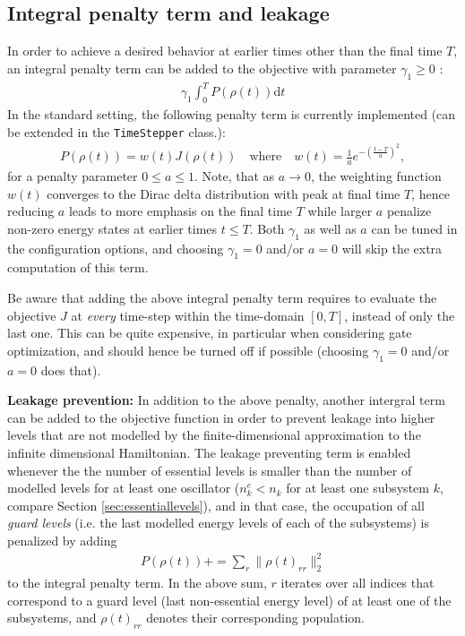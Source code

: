\documentclass[11pt]{article}
\begin{document}
\subsection{Integral penalty term and leakage}\label{sec:penalty}
In order to achieve a desired behavior at earlier times other than the final time $T$, an integral penalty term can be added to the objective with parameter $\gamma_1 \geq 0$ :
\begin{align}\label{eq:penaltyterm}
 \gamma_1 \int_0^T P(\rho(t)) \mathrm{d}t
\end{align}
In the standard setting, the following penalty term is currently implemented (can be extended in the \texttt{TimeStepper} class.):
\begin{align}\label{eq:penaltyterm}
  P(\rho(t))  =  w(t) J\left(\rho(t)\right) \quad \text{where} \quad w(t) =
  \frac{1}{a} e^{ -\left(\frac{t-T}{a} \right)^2},
\end{align}
for a penalty parameter $0 \leq a \leq 1$. Note, that as $a\to 0$, the weighting function $w(t)$ converges to the Dirac delta distribution with peak at final time $T$, hence reducing $a$ leads to more emphasis on the final time $T$ while larger $a$ penalize non-zero energy states at earlier times $t\leq T$. Both $\gamma_1$ as well as $a$ can be tuned in the configuration options, and choosing $\gamma_1 = 0$ and/or $a=0$ will skip the extra computation of this term. 

Be aware that adding the above integral penalty term requires to evaluate the objective $J$ at \textit{every} time-step within the time-domain $[0,T]$, instead of only the last one. This can be quite expensive, in particular when considering gate optimization, and should hence be turned off if possible (choosing $\gamma_1=0$ and/or $a=0$ does that).

\textbf{Leakage prevention:}
In addition to the above penalty, another intergral term can be added to the objective function in order to prevent leakage into higher levels that are not modelled by the finite-dimensional approximation to the infinite dimensional Hamiltonian. The leakage preventing term is enabled whenever the the number of essential levels is smaller than the number of modelled levels for at least one oscillator ($n_k^e < n_k$ for at least one subsystem $k$, compare Section \ref{sec:essentiallevels}), and in that case, the occupation of all \textit{guard levels} (i.e. the last modelled energy levels of each of the subsystems) is penalized by adding
\begin{align}\label{eq:leakprevention}
  P(\rho(t)) += \sum_{r} \| \rho(t)_{rr} \|^2_2
\end{align}
to the integral penalty term.
In the above sum, $r$ iterates over all indices that correspond to a guard level (last non-essential energy level) of at least one of the subsystems, and $\rho(t)_{rr}$ denotes their corresponding population. 
\end{document}
